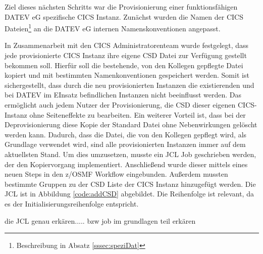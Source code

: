 Ziel dieses nächsten Schritts war die Provisionierung einer funktionsfähigen DATEV eG spezifische CICS Instanz.
Zunächst wurden die Namen der CICS Dateien\footnote{Beschreibung in Absatz \ref{sssec:speziDat}} an die DATEV eG internen Namenskonventionen angepasst.

In Zusammenarbeit mit den CICS Administratorenteam wurde festgelegt, dass  jede provisionierte CICS Instanz ihre eigene CSD Datei zur Verfügung gestellt bekommen soll.
Hierfür soll die bestehende, von den Kollegen gepflegte Datei kopiert und mit bestimmten Namenkonventionen gespeichert werden.
Somit ist sichergestellt, dass durch die neu provisionierten Instanzen die existierenden und bei DATEV im EInsatz befindlichen Instanzen  nicht beeinflusst werden.
Das ermöglicht auch jedem Nutzer der Provisionierung, die CSD dieser eigenen CICS-Instanz ohne Seiteneffekte zu bearbeiten.
Ein weiterer Vorteil ist, dass bei der Deprovisionierung diese Kopie der Standard Datei ohne Nebenwirkungen gelöscht werden kann.
Dadurch, dass die Datei, die von den Kollegen gepflegt wird, als Grundlage verwendet wird, sind alle provisionierten Instanzen immer auf dem aktuellsten Stand.
Um dies umzusetzen, musste ein JCL Job geschrieben werden, der den Kopiervorgang implementiert.
Anschließend wurde dieser mittels eines neuen Steps in den z/OSMF Workflow eingebunden.
Außerdem mussten bestimmte Gruppen zu der CSD Liste der CICS Instanz hinzugefügt werden.
Die JCL ist in Abbildung \ref{code:addCSD} abgebildet.
Die Reihenfolge ist relevant, da es der Initialisierungsreihenfolge entspricht.

die JCL genau erkären..... bzw job im grundlagen teil erkären


